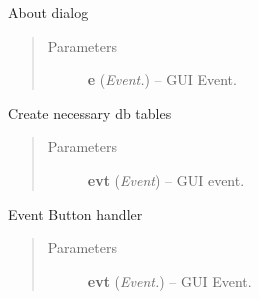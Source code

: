 \documentclass[letterpaper,10pt,english]{sphinxmanual}
\begin{document}
\begin{fulllineitems}
\begin{fulllineitems}
\begin{quote}
\begin{description}
\end{description}\end{quote}

\end{fulllineitems}


\begin{fulllineitems}
\label{api:wos.GUI.OnAboutBox}
About dialog
\begin{quote}\begin{description}
\item[{Parameters}] \leavevmode
\textbf{e} (\emph{Event.}) -- GUI Event.

\end{description}\end{quote}

\end{fulllineitems}


\begin{fulllineitems}
\label{api:wos.GUI.OnCreateTables}
Create necessary db tables
\begin{quote}\begin{description}
\item[{Parameters}] \leavevmode
\textbf{evt} (\emph{Event}) -- GUI event.

\end{description}\end{quote}

\end{fulllineitems}


\begin{fulllineitems}
\label{api:wos.GUI.OnEvtBtn}
Event Button handler
\begin{quote}\begin{description}
\item[{Parameters}] \leavevmode
\textbf{evt} (\emph{Event.}) -- GUI Event.

\end{description}\end{quote}

\end{fulllineitems}


\end{fulllineitems}
\end{document}
